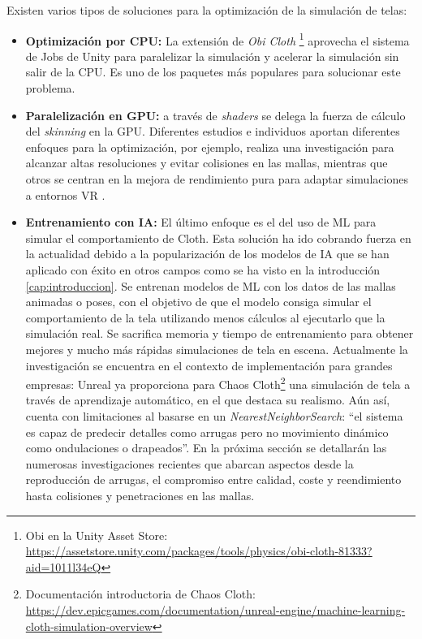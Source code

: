 Existen varios tipos de soluciones para la optimización de la simulación de telas:
\begin{itemize}
  \item \textbf{Optimización por CPU:} La extensión de \textit{Obi Cloth} \footnote{Obi en la Unity Asset Store: \url{https://assetstore.unity.com/packages/tools/physics/obi-cloth-81333?aid=1011l34eQ}} aprovecha el sistema de Jobs de Unity para paralelizar la simulación y acelerar la simulación sin salir de la CPU. Es uno de los paquetes más populares para solucionar este problema.
  \item \textbf{Paralelización en GPU:} a través de \textit{shaders} se delega la fuerza de cálculo del \textit{skinning} en la GPU. Diferentes estudios e individuos aportan diferentes enfoques para la optimización, por ejemplo, \cite{huguninunite16} realiza una investigación para alcanzar altas resoluciones y evitar colisiones en las mallas, mientras que otros se centran en la mejora de rendimiento pura para adaptar simulaciones a entornos VR \cite{VRGPUoptim}.
  \item \textbf{Entrenamiento con IA:}  El último enfoque es el del uso de ML para simular el comportamiento de Cloth. Esta solución ha ido cobrando fuerza en la actualidad debido a la popularización de los modelos de IA que se han aplicado con éxito en otros campos como se ha visto en la introducción \ref{cap:introduccion}. Se entrenan modelos de ML con los datos de las mallas animadas o poses, con el objetivo de que el modelo consiga simular el comportamiento de la tela utilizando menos cálculos al ejecutarlo que la simulación real.
  Se sacrifica memoria y tiempo de entrenamiento para obtener mejores y mucho más rápidas simulaciones de tela en escena. Actualmente la investigación se encuentra en el contexto de implementación para grandes empresas: Unreal ya proporciona para Chaos Cloth\footnote{Documentación introductoria de Chaos Cloth: \url{https://dev.epicgames.com/documentation/unreal-engine/machine-learning-cloth-simulation-overview}} una simulación de tela a través de aprendizaje automático, en el que destaca su realismo. Aún así, cuenta con limitaciones al basarse en un \textit{NearestNeighborSearch}: ``el sistema es capaz de predecir detalles como arrugas pero no movimiento dinámico como ondulaciones o drapeados''. En la próxima sección se detallarán las numerosas investigaciones recientes que abarcan aspectos desde la reproducción de arrugas, el compromiso entre calidad, coste y reendimiento hasta colisiones y penetraciones en las mallas.
\end{itemize}

